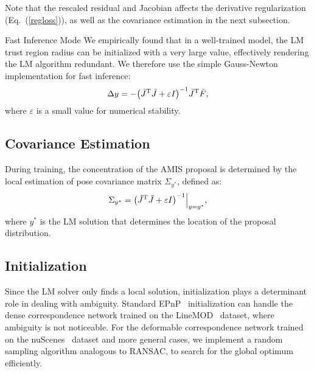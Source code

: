 \documentclass[10pt,twocolumn,letterpaper]{article}
\makeatletter
\let\originalleft\left
\let\originalright\right
\renewcommand{\left}{\mathopen{}\mathclose\bgroup\originalleft}
\renewcommand{\right}{\aftergroup\egroup\originalright}
\renewcommand{\paragraph}{
  \@startsection{paragraph}{4}
  {\z@}{1.0ex \@plus 0ex \@minus .3ex}{-1em}
  {\normalfont\normalsize\bfseries}
}
\makeatother
\begin{document}
Note that the rescaled residual and Jacobian affects the derivative regularization (Eq.~(\ref{regloss})), as well as the covariance estimation in the next subsection.

\paragraph{Fast Inference Mode} We empirically found that in a well-trained model, the LM trust region radius can be initialized with a very large value, effectively rendering the LM algorithm redundant. We therefore use the simple Gauss-Newton implementation for fast inference:
\begin{equation}
    \Delta y = -\left(\tilde{J}^\text{T}\tilde{J} + \varepsilon I \right)^{-1} \tilde{J}^\text{T} \tilde{F},
\end{equation}
where $\varepsilon$ is a small value for numerical stability.

\subsection{Covariance Estimation}
During training, the concentration of the AMIS proposal is determined by the local estimation of pose covariance matrix $\Sigma_{y^\ast}$, defined as:
\begin{equation}
    \Sigma_{y^\ast} = \left( \tilde{J}^\text{T} \tilde{J} + \varepsilon I \right)^{-1} \Big\rvert_{y=y^\ast},
\end{equation}
where $y^\ast$ is the LM solution that determines the location of the proposal distribution.

\subsection{Initialization}
\label{rslm}

Since the LM solver only finds a local solution, initialization plays a determinant role in dealing with ambiguity. Standard EPnP~\cite{EPnP} initialization can handle the dense correspondence network trained on the LineMOD~\cite{linemod} dataset, where ambiguity is not noticeable. For the deformable correspondence network trained on the nuScenes~\cite{nuscenes} dataset and more general cases, we implement a random sampling algorithm analogous to RANSAC, to search for the global optimum efficiently.
\end{document}

